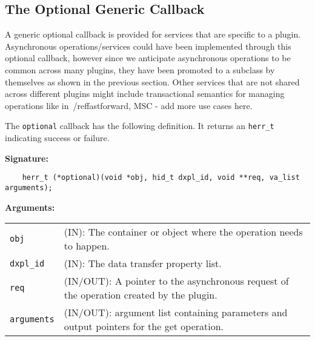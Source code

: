 \subsection{The Optional Generic Callback}
A generic optional callback is provided for services that are specific to a plugin. Asynchronous operations/services could have been implemented through this optional callback, however since we anticipate asynchronous operations to be common across many plugins, they have been promoted to a subclass by themselves as shown in the previous section. Other services that are not shared across different plugins might include transactional semantics for managing operations like in~/ref{fastforward}, MSC - add more use cases here.

The \texttt{optional} callback has the following definition. It returns an \texttt{herr\_t} indicating success or failure.\bigskip 

\begin{mdframed}[style=bgbox]
\textbf{Signature:}
\begin{lstlisting}
    herr_t (*optional)(void *obj, hid_t dxpl_id, void **req, va_list arguments);
\end{lstlisting}

\textbf{Arguments:}\\
\begin{tabular}{l p{10cm}}
  \texttt{obj} & (IN): The container or object where the operation needs to happen.\\
  \texttt{dxpl\_id} & (IN): The data transfer property list.\\
  \texttt{req} & (IN/OUT): A pointer to the asynchronous request of the operation created by the plugin.\\
  \texttt{arguments} & (IN/OUT): argument list containing parameters and output pointers for the get operation. \\
\end{tabular}
\end{mdframed}

